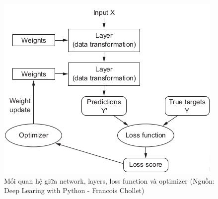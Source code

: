 \documentclass[a4paper, 12pt]{report}
\begin{document}
\begin{figure}[!h]
	\centering
	\includegraphics[width=0.8\linewidth]{Images/nn3}
	\caption{Mối quan hệ giữa network, layers, loss function và optimizer (Nguồn: Deep Learing with Python - Francois Chollet)}
	\label{fig:nn3}
\end{figure}
\end{document}
